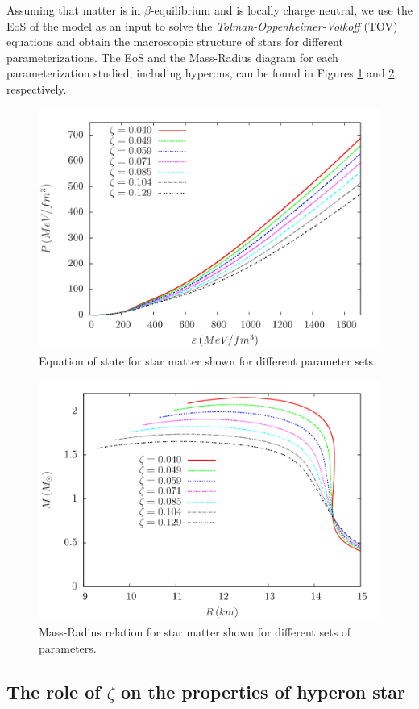 \documentclass[twocolumn,showpacs,aps]{revtex4}
\begin{document}
Assuming that matter is in $\beta$-equilibrium and is locally charge neutral, we use the EoS of the model as an input to 
solve the {\it Tolman-Oppenheimer-Volkoff} (TOV) equations \cite{Tolman1939,Oppenheimer1939}  and
obtain the macroscopic structure of stars for different parameterizations.
The EoS and the Mass-Radius diagram for each parameterization studied, including hyperons, can be found 
in Figures \ref{eos_lambda} and \ref{tov_lambda}, respectively.

 \begin{figure}
 \centering
 \vspace{1.0cm}
 \includegraphics[width=9.cm]{eos_paper.png}
 \caption{\label{eos_lambda} Equation of state for star matter shown for different parameter sets.}
 \end{figure}
 \begin{figure}
 \centering
 \vspace{1.0cm}
 \includegraphics[width=9.cm]{tov_lambda.png}
 \caption{\label{tov_lambda} Mass-Radius relation for star matter shown for different sets of parameters.}
 \end{figure}

 
 \subsection{The role of $\zeta$ on the properties of hyperon star} \label{zetastar_section}
\end{document}

